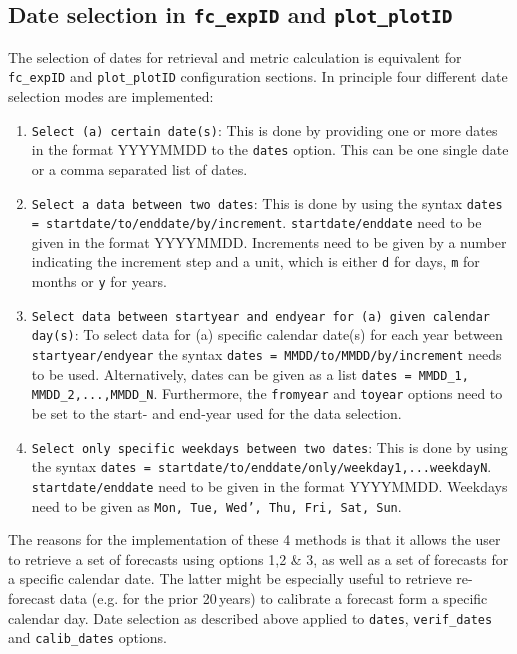 \documentclass[DIV=10, parskip=full]{scrreprt}
\begin{document}
\subsection{Date selection in \texttt{fc\_expID} and \texttt{plot\_plotID}}\label{sec:dates}
The selection of dates for retrieval and metric calculation is equivalent for  \texttt{fc\_expID} and \texttt{plot\_plotID} configuration sections. In principle four different date selection modes are implemented:
\begin{enumerate}
	\item \texttt{Select (a) certain date(s)}: This is done by providing one or more dates in the format YYYYMMDD to the \texttt{dates} option. This can be one single date or a comma separated list of dates.
	\item \texttt{Select a data between two dates}: This is done by using the syntax \texttt{dates = startdate/to/enddate/by/increment}. \texttt{startdate/enddate} need to be given in the format YYYYMMDD. Increments need to be given by a number indicating the increment step and a unit, which is either \texttt{d} for days, \texttt{m} for months or \texttt{y} for years.
	\item \texttt{Select data between startyear and endyear for (a) given calendar day(s)}: To select data for (a) specific calendar date(s) for each year between \texttt{startyear/endyear} the syntax \texttt{dates = MMDD/to/MMDD/by/increment} needs to be used. Alternatively, dates can be given as a list \texttt{dates = MMDD\_1, MMDD\_2,...,MMDD\_N}.  Furthermore, the \texttt{fromyear} and \texttt{toyear} options need to be set to the start- and end-year used for the data selection.  
	\item \texttt{Select only specific weekdays between two dates}: This is done by using the syntax \texttt{dates = startdate/to/enddate/only/weekday1,...weekdayN}. \texttt{startdate/enddate} need to be given in the format YYYYMMDD. Weekdays need to be given as \texttt{Mon, Tue, Wed', Thu, Fri, Sat, Sun}.
\end{enumerate}

The reasons for the implementation of these 4 methods is that it allows the user to retrieve a set of forecasts using options 1,2 \& 3, as well as a set of forecasts for a specific calendar date. The latter might be especially useful to retrieve re-forecast data (e.g. for the prior 20\,years) to calibrate a forecast form a specific calendar day. Date selection as described above applied to   \texttt{dates}, \texttt{verif\_dates} and  \texttt{calib\_dates} options.
\end{document}
